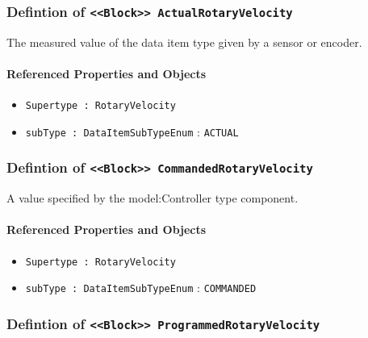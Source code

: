 \subsubsection{Defintion of \texttt{<<Block>> ActualRotaryVelocity}}
  \label{type:ActualRotaryVelocity}

\FloatBarrier

The measured value of the data item type given by a sensor or encoder.

\FloatBarrier
\paragraph{Referenced Properties and Objects}

\begin{itemize}
\item \texttt{Supertype : RotaryVelocity}

\item \texttt{subType : DataItemSubTypeEnum} : \texttt{ACTUAL}

\end{itemize}
\FloatBarrier
\subsubsection{Defintion of \texttt{<<Block>> CommandedRotaryVelocity}}
  \label{type:CommandedRotaryVelocity}

\FloatBarrier

A value specified by the {model:Controller} type component.

\FloatBarrier
\paragraph{Referenced Properties and Objects}

\begin{itemize}
\item \texttt{Supertype : RotaryVelocity}

\item \texttt{subType : DataItemSubTypeEnum} : \texttt{COMMANDED}

\end{itemize}
\FloatBarrier
\subsubsection{Defintion of \texttt{<<Block>> ProgrammedRotaryVelocity}}
  \label{type:ProgrammedRotaryVelocity}

\FloatBarrier

